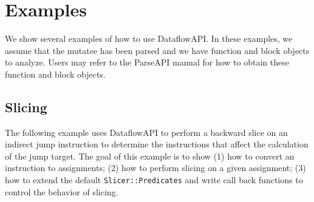 \section{Examples}
\label{sec:examples}
We show several examples of how to use DataflowAPI. In these examples, we assume
that the mutatee has been parsed and we have function and block objects to analyze.
Users may refer to the ParseAPI manual for how to obtain these function and block objects.

\subsection{Slicing}
The following example uses DataflowAPI to perform a backward slice on an
indirect jump instruction to determine the instructions that affect the
calculation of the jump target. The goal of this example is to show (1) how to
convert an instruction to assignments; (2) how to perform slicing on a given
assignment; (3) how to extend the default \texttt{Slicer::Predicates} and write
call back functions to control the behavior of slicing.

